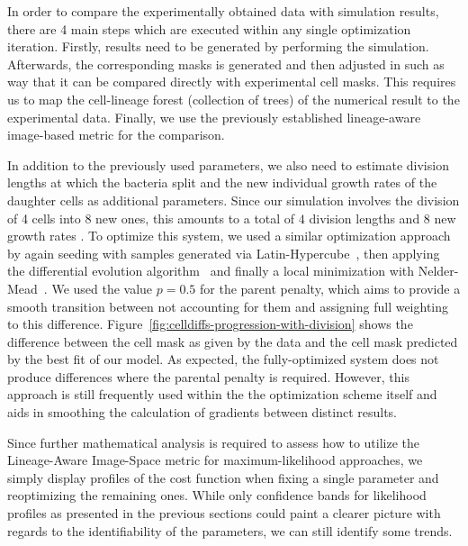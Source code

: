 In order to compare the experimentally obtained data with simulation results, there
are 4 main steps
which are executed within any single optimization iteration.
Firstly, results need to be generated by performing the simulation.
Afterwards, the corresponding masks is generated and then adjusted in such as way that it can be
compared directly with experimental cell masks.
This requires us to map the cell-lineage forest (collection of trees) of the
numerical result to the
experimental data.
Finally, we use the previously established lineage-aware image-based metric for the comparison.

In addition to the previously used parameters, we also need to estimate division lengths at
which the bacteria split and the new individual growth rates of the daughter cells as additional
parameters.
Since our simulation involves the division of 4 cells into 8 new ones, this amounts
to a total of
$4$ division lengths and $8$ new growth rates .
To optimize this system, we used a similar optimization approach by again seeding with samples
generated via Latin-Hypercube~\cite{McKay1979}, then applying the differential evolution
algorithm~\cite{Storn1997} and finally a local minimization with Nelder-Mead~\cite{Gao2010}.
We used the value $p=0.5$ for the parent penalty, which aims to provide a smooth
transition between
not accounting for them and assigning full weighting to this difference.
Figure~\ref{fig:celldiffs-progression-with-division} shows the difference between the
cell mask as
given by the data and the cell mask predicted by the best fit of our model.
As expected, the fully-optimized system does not produce differences where the
parental penalty is
required.
However, this approach is still frequently used within the the optimization scheme
itself and aids
in smoothing the calculation of gradients between distinct results.

Since further mathematical analysis is required to assess how to utilize the Lineage-Aware
Image-Space metric for maximum-likelihood approaches, we simply display profiles of the cost
function when fixing a single parameter and reoptimizing the remaining ones.
While only confidence bands for likelihood profiles as presented in the previous sections could
paint a clearer picture with regards to the identifiability of the parameters, we can still
identify some trends.

